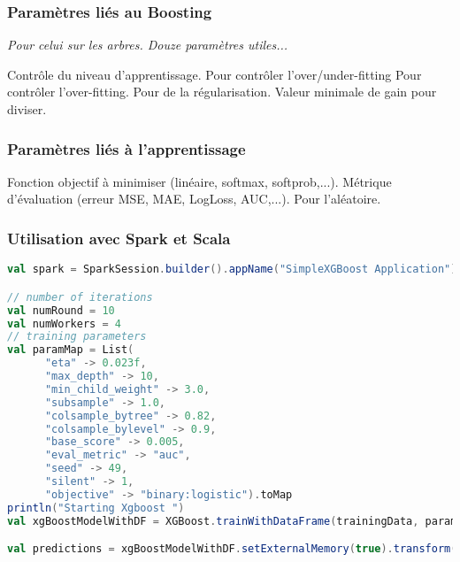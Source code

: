 \begin{frame}
	\frametitle{Paramètres liés au Boosting}
	\textit{Pour celui sur les arbres. Douze paramètres utiles...}\vspace*{.2cm}

	\begin{itemize}
		Contrôle du niveau d'apprentissage.
		Pour contrôler l'over/under-fitting
		Pour contrôler l'over-fitting.
		Pour de la régularisation.
		Valeur minimale de gain pour diviser.
	\end{itemize}
\end{frame}

\begin{frame}
	\frametitle{Paramètres liés à l'apprentissage}
	\begin{itemize}
		Fonction objectif à minimiser (linéaire, softmax, softprob,...).\vspace*{.2cm}
		Métrique d'évaluation (erreur MSE, MAE, LogLoss, AUC,...).\vspace*{.2cm}
		Pour l'aléatoire.\vspace*{.2cm}
	\end{itemize}
\end{frame}

\begin{frame}[fragile]
	\frametitle{Utilisation avec Spark et Scala}
	\begin{lstlisting}[language=Scala]
val spark = SparkSession.builder().appName("SimpleXGBoost Application").config("spark.executor.memory", "2G").config("spark.executor.cores", "4").config("spark.default.parallelism", "4").master("local[*]").getOrCreate()

// number of iterations
val numRound = 10
val numWorkers = 4
// training parameters
val paramMap = List(
      "eta" -> 0.023f,
      "max_depth" -> 10,
      "min_child_weight" -> 3.0,
      "subsample" -> 1.0,
      "colsample_bytree" -> 0.82,
      "colsample_bylevel" -> 0.9,
      "base_score" -> 0.005,
      "eval_metric" -> "auc",
      "seed" -> 49,
      "silent" -> 1,
      "objective" -> "binary:logistic").toMap
println("Starting Xgboost ")
val xgBoostModelWithDF = XGBoost.trainWithDataFrame(trainingData, paramMap,round = numRound, nWorkers = numWorkers, useExternalMemory = true)

val predictions = xgBoostModelWithDF.setExternalMemory(true).transform(testData).select("label", "probabilities")\end{lstlisting}
\end{frame}

